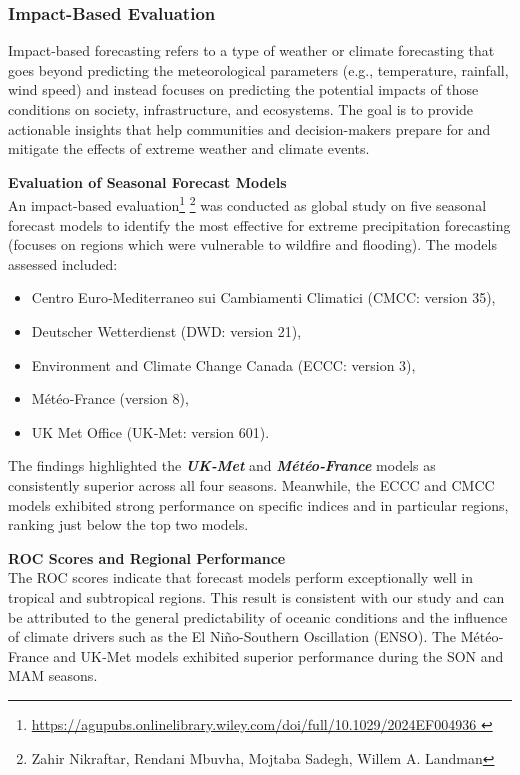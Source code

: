 \subsubsection{Impact-Based Evaluation}
Impact-based forecasting refers to a type of weather or climate forecasting that goes beyond predicting the meteorological parameters (e.g., temperature, rainfall, wind speed) and instead focuses on predicting the potential impacts of those conditions on society, infrastructure, and ecosystems. The goal is to provide actionable insights that help communities and decision-makers prepare for and mitigate the effects of extreme weather and climate events.

\textbf{Evaluation of Seasonal Forecast Models}\\
An impact-based evaluation\footnote{\url{https://agupubs.onlinelibrary.wiley.com/doi/full/10.1029/2024EF004936 }} \footnote{Zahir Nikraftar, Rendani Mbuvha, Mojtaba Sadegh, Willem A. Landman} was conducted as global study on five seasonal forecast models to identify the most effective for extreme precipitation forecasting (focuses on regions which were vulnerable to wildfire and flooding). The models assessed included:
\begin{itemize}
    \item Centro Euro‐Mediterraneo sui Cambiamenti Climatici (CMCC: version 35),
    \item Deutscher Wetterdienst (DWD: version 21),
    \item Environment and Climate Change Canada (ECCC: version 3),
    \item Météo‐France (version 8),
    \item UK Met Office (UK‐Met: version 601).
\end{itemize}

The findings highlighted the \textbf{\textit{UK‐Met} }  and \textbf{\textit{Météo‐France} } models as consistently superior across all four seasons. Meanwhile, the ECCC and CMCC models exhibited strong performance on specific indices and in particular regions, ranking just below the top two models.

\textbf{ROC Scores and Regional Performance}\\
The ROC scores indicate that forecast models perform exceptionally well in tropical and subtropical regions. This result is consistent with our study and can be attributed to the general predictability of oceanic conditions and the influence of climate drivers such as the El Niño-Southern Oscillation (ENSO). The Météo‐France and UK‐Met models exhibited superior performance during the SON and MAM seasons.

